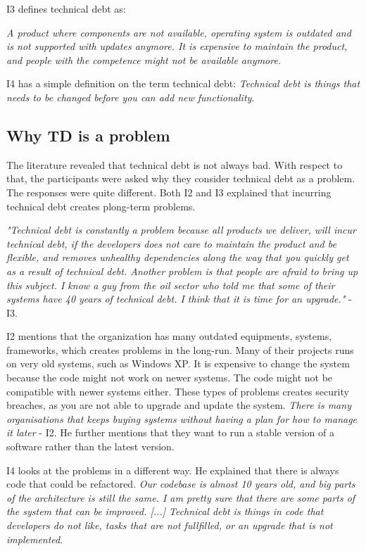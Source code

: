 I3 defines technical debt as:
\begin{displayquote}
\textit{A product where components are not available, operating system is outdated and is not supported with updates anymore. It is expensive to maintain the product, and people with the competence might not be available anymore}.
\end{displayquote}

I4 has a simple definition on the term technical debt: \textit{Technical debt is things that needs to be changed before you can add new functionality}.

\subsection{Why TD is a problem}
The literature revealed that technical debt is not always bad\cite{p31-guo}. With respect to that, the participants were asked why they consider technical debt as a problem. The responses were quite different. Both I2 and I3 explained that incurring technical debt creates plong-term problems. 

\begin{displayquote}
	\textit{"Technical debt is constantly a problem because all products we deliver, will incur technical debt, if the developers does not care to maintain the product and be flexible, and removes unhealthy dependencies along the way that you quickly get as a result of technical debt. Another problem is that people are afraid to bring up this subject. I know a guy from the oil sector who told me that some of their systems have 40 years of technical debt. I think that it is time for an upgrade."} - I3.
\end{displayquote}

I2 mentions that the organization has many outdated equipments, systems, frameworks, which creates problems in the long-run. Many of their projects runs on very old systems, such as Windows XP. It is expensive to change the system because the code might not work on newer systems. The code might not be compatible with newer systems either. These types of problems creates security breaches, as you are not able to upgrade and update the system. \textit{There is many organisations that keeps buying systems without having a plan for how to manage it later} - I2. He further mentions that they want to run a stable version of a software rather than the latest version.

I4 looks at the problems in a different way. He explained that there is always code that could be refactored. \textit{Our codebase is almost 10 years old, and big parts of the architecture is still the same. I am pretty sure that there are some parts of the system that can be improved. [...] Technical debt is things in code that developers do not like, tasks that are not fullfilled, or an upgrade that is not implemented}. 

